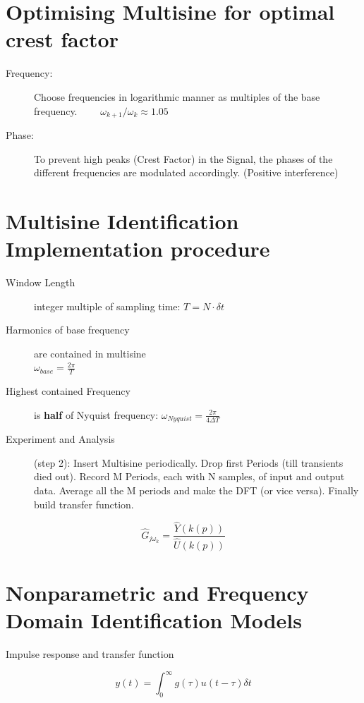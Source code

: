 \section*{Optimising Multisine for optimal crest factor}
\begin{description}
\item[Frequency:] Choose frequencies in logarithmic manner as multiples of the base frequency. $\qquad \omega_{k+1}/\omega_{k} \approx 1.05$
\item[Phase:] To prevent high peaks (Crest Factor) in the Signal, the phases of the different frequencies are modulated accordingly. (Positive interference)
\end{description}


\section*{Multisine Identification Implementation procedure}
\begin{description}
\item[Window Length] integer multiple of sampling time:  \( T = N \cdot \delta t\)
\item[Harmonics of base frequency] are contained in multisine \\ \( {\omega}_{base} = \frac{2 \pi}{T}\)
\item[Highest contained Frequency] is \textbf{half} of Nyquist frequency: \( {\omega}_{Nyquist}  = \frac{2 \pi}{4 \Delta T}\)

\item[Experiment and Analysis] (step 2): Insert Multisine periodically. Drop first Periods (till transients died out). Record M Periods, each with N samples, of input and output data. Average all the M periods and make the DFT (or vice versa). Finally build transfer function.
\end{description}

\begin{equation*}
{\hat{G} _{j{\omega}_{k}}}=\frac{\hat{Y}(k(p))}{\hat{U}(k(p))}
\end{equation*}





\section*{Nonparametric and Frequency Domain Identification Models}
Impulse response and transfer function

\begin{equation*}
y(t)=\int _{ 0 }^{ \infty  }{ g(\tau)u(t-\tau) \delta t } 
\end{equation*}

